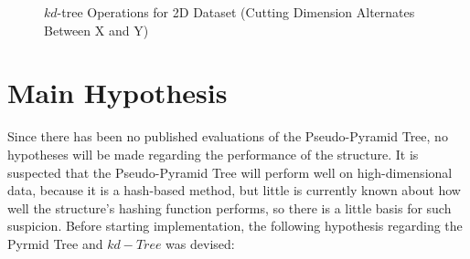 \begin{figure}
	\begin{center}
	\end{center}

	\caption{$kd$-tree Operations for 2D Dataset (Cutting Dimension Alternates Between X and Y)}
	\label{fig:kd-tree}
\end{figure}

\section{Main Hypothesis}
\label{sec:main-hypothesis}

Since there has been no published evaluations of the Pseudo-Pyramid Tree, no hypotheses will be made regarding the performance of the structure. It is suspected that the Pseudo-Pyramid Tree will perform well on high-dimensional data, because it is a hash-based method, but little is currently known about how well the structure's hashing function performs, so there is a little basis for such suspicion. Before starting implementation, the following hypothesis regarding the Pyrmid Tree and $kd-Tree$ was devised:

